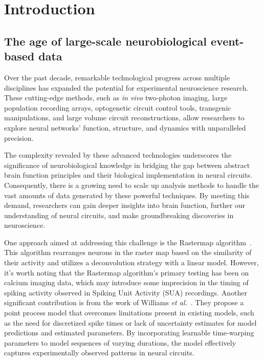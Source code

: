 \documentclass[runningheads]{llncs}
\begin{document}
\section{Introduction}

\subsection{The age of large-scale neurobiological event-based data}
% 
Over the past decade, remarkable technological progress across multiple disciplines has expanded the potential for experimental neuroscience research. These cutting-edge methods, such as \textit{in vivo} two-photon imaging, large population recording arrays, optogenetic circuit control tools, transgenic manipulations, and large volume circuit reconstructions, allow researchers to explore neural networks' function, structure, and dynamics with unparalleled precision.

The complexity revealed by these advanced technologies underscores the significance of neurobiological knowledge in bridging the gap between abstract brain function principles and their biological implementation in neural circuits. Consequently, there is a growing need to scale up analysis methods to handle the vast amounts of data generated by these powerful techniques. By meeting this demand, researchers can gain deeper insights into brain function, further our understanding of neural circuits, and make groundbreaking discoveries in neuroscience.

One approach aimed at addressing this challenge is the Rastermap algorithm~\cite{pachitariu_robustness_2018}. This algorithm rearranges neurons in the raster map based on the similarity of their activity and utilizes a deconvolution strategy with a linear model. However, it's worth noting that the Rastermap algorithm's primary testing has been on calcium imaging data, which may introduce some imprecision in the timing of spiking activity observed in Spiking Unit Activity (SUA) recordings. 
Another significant contribution is from the work of Williams {\it et al.}~\cite{williams_point_2020}. They propose a point process model that overcomes limitations present in existing models, such as the need for discretized spike times or lack of uncertainty estimates for model predictions and estimated parameters. By incorporating learnable time-warping parameters to model sequences of varying durations, the model effectively captures experimentally observed patterns in neural circuits. %
%
\end{document}
